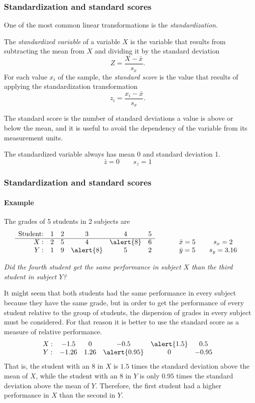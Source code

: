 \begin{frame}
\frametitle{Standardization and standard scores}
One of the most common linear transformations is the \emph{standardization}.
\begin{definition}
The \emph{standardized variable} of a variable $X$ is the variable that results from subtracting the mean from $X$ and dividing it by the standard deviation 
\[
Z=\frac{X-\bar x}{s_{x}}.
\]
For each value $x_i$ of the sample, the \emph{standard score} is the value that results of applying the standardization transformation
\[
z_i=\frac{x_i-\bar x}{s_{x}}.
\]
\end{definition}

The standard score is the number of standard deviations a value is above or below the mean, and it is useful to avoid the dependency of the variable from its measurement units.

The standardized variable always has mean 0 and standard deviation 1.  
\[
\bar z = 0 \qquad s_{z} = 1
\]
\end{frame}


\begin{frame}
\frametitle{Standardization and standard scores}
\framesubtitle{Example}
The grades of 5 students in 2 subjects are
\[
\begin{array}{rccccccccc}
\mbox{Student:} & 1 & 2 & 3 & 4 & 5\\ \cline{1-6}
X: & 2 & 5 & 4 & \alert{8} & 6 & \qquad & \bar x = 5 & \quad s_x = 2\\
Y: & 1 & 9 & \alert{8} & 5 & 2 & \qquad & \bar y = 5 & \quad s_y = 3.16\\
\end{array}
\]

\emph{Did the fourth student get the same performance in subject $X$ than the third student in subject $Y$?}

It might seem that both students had the same performance in every subject because they have the same
grade, but in order to get the performance of every student relative to the group of students, the dispersion
of grades in every subject must be considered.
For that reason it is better to use the standard score as a measure of relative performance. 
\[
\begin{array}{cccccc}
X: & -1.5 & 0 & -0.5 & \alert{1.5} & 0.5 \\
Y: & -1.26 & 1.26 & \alert{0.95} & 0 & -0.95\\
\end{array}
\]
That is, the student with an 8 in $X$ is $1.5$ times the standard deviation above the mean of $X$, while the student with an 8 in $Y$ is only $0.95$ times the standard deviation above the mean of $Y$. 
Therefore, the first student had a higher performance in $X$ than the second in $Y$.
\end{frame}



